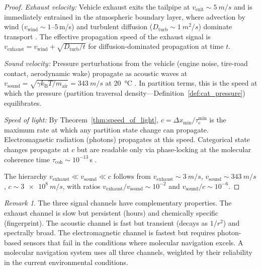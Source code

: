 \documentclass[11pt,twocolumn,a4paper]{article}
\theoremstyle{plain}
\theoremstyle{definition}
\theoremstyle{remark}
\newtheorem{remark}[theorem]{Remark}
\newcommand{\kB}{k_{\mathrm{B}}}
\newcommand{\tauc}{\tau_{\mathrm{c}}}
\newcommand{\taucoh}{\tau_{\mathrm{coh}}}
\newcommand{\Dturb}{D_{\mathrm{turb}}}
\begin{document}
\begin{proof}
\emph{Exhaust velocity:} Vehicle exhaust exits the tailpipe at $v_{\mathrm{exit}} \sim \SI{5}{m/s}$ and is immediately entrained in the atmospheric boundary layer, where advection by wind ($v_{\mathrm{wind}} \sim 1$--$5$\,m/s) and turbulent diffusion ($\Dturb \sim \SI{1}{m^2/s}$) dominate transport \cite{stull1988introduction}. The effective propagation speed of the exhaust signal is $v_{\mathrm{exhaust}} = v_{\mathrm{wind}} + \sqrt{\Dturb / t}$ for diffusion-dominated propagation at time $t$.

\emph{Sound velocity:} Pressure perturbations from the vehicle (engine noise, tire-road contact, aerodynamic wake) propagate as acoustic waves at $v_{\mathrm{sound}} = \sqrt{\gamma \kB T / m_{\mathrm{air}}} = \SI{343}{m/s}$ at \SI{20}{\celsius} \cite{landau1987fluid}. In partition terms, this is the speed at which the pressure (partition traversal density---Definition~\ref{def:cat_pressure}) equilibrates.

\emph{Speed of light:} By Theorem~\ref{thm:speed_of_light}, $c = \Delta x_{\min}/\tauc^{\min}$ is the maximum rate at which any partition state change can propagate. Electromagnetic radiation (photons) propagates at this speed. Categorical state changes propagate at $c$ but are readable only via phase-locking at the molecular coherence time $\taucoh \sim 10^{-13}$\,s \cite{sachikonye2026transplanckian}.

The hierarchy $v_{\mathrm{exhaust}} \ll v_{\mathrm{sound}} \ll c$ follows from $v_{\mathrm{exhaust}} \sim \SI{3}{m/s}$, $v_{\mathrm{sound}} \sim \SI{343}{m/s}$, $c \sim \SI{3e8}{m/s}$, with ratios $v_{\mathrm{exhaust}}/v_{\mathrm{sound}} \sim 10^{-2}$ and $v_{\mathrm{sound}}/c \sim 10^{-6}$.
\end{proof}

\begin{remark}
The three signal channels have complementary properties. The exhaust channel is slow but persistent (hours) and chemically specific (fingerprint). The acoustic channel is fast but transient (decays as $1/r^2$) and spectrally broad. The electromagnetic channel is fastest but requires photon-based sensors that fail in the conditions where molecular navigation excels. A molecular navigation system uses all three channels, weighted by their reliability in the current environmental conditions.
\end{remark}



\end{document}
